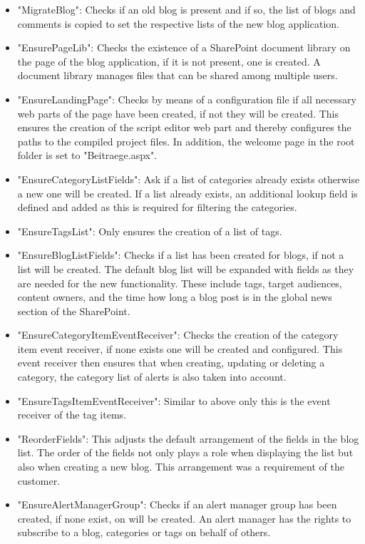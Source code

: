 \documentclass[Bachelor,BIF,english]{twbook}
\begin{document}
\begin{itemize}
\item "MigrateBlog": Checks if an old blog is present and if so, the list of blogs and comments is copied to set the respective lists of the new blog application.
\item "EnsurePageLib": Checks the existence of a SharePoint document library \cite{SPDocumentLibrary} on the page of the blog application, if it is not present, one is created. A document library manages files that can be shared among multiple users.
\item "EnsureLandingPage": Checks by means of a configuration file if all necessary web parts of the page have been created, if not they will be created. This ensures the creation of the script editor web part and thereby configures the paths to the compiled project files. In addition, the welcome page in the root folder is set to "Beitraege.aspx".
\item "EnsureCategoryListFields": Ask if a list of categories already exists otherwise a new one will be created. If a list already exists, an additional lookup field is defined and added as this is required for filtering the categories.
\item "EnsureTagsList": Only ensures the creation of a list of tags.
\item "EnsureBlogListFields": Checks if a list has been created for blogs, if not a list will be created. The default blog list will be expanded with fields as they are needed for the new functionality. These include tags, target audiences, content owners, and the time how long a blog post is in the global news section of the SharePoint.
\item "EnsureCategoryItemEventReceiver": Checks the creation of the category item event receiver, if none exists one will be created and configured. This event receiver then ensures that when creating, updating or deleting a category, the category list of alerts is also taken into account.
\item "EnsureTagsItemEventReceiver": Similar to above only this is the event receiver of the tag items.
\item "ReorderFields": This adjusts the default arrangement of the fields in the blog list. The order of the fields not only plays a role when displaying the list but also when creating a new blog. This arrangement was a requirement of the customer.
\item "EnsureAlertManagerGroup": Checks if an alert manager group has been created, if none exist, on will be created. An alert manager has the rights to subscribe to a blog, categories or tags on behalf of others.
\end{itemize}
\end{document}
